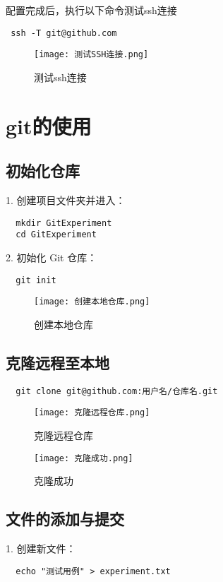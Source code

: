 \documentclass[a4paper, 12pt]{article}
\begin{document}
配置完成后，执行以下命令测试ssh连接
\begin{verbatim}
 ssh -T git@github.com
  \end{verbatim}
  
\begin{figure}[H]
  \centering
 \texttt{[image: 测试SSH连接.png]}
  \caption{测试ssh连接}
   \end{figure}
   
  \newpage
  \section{git的使用}
  \subsection{初始化仓库}
  1. 创建项目文件夹并进入：
  \begin{verbatim}
  mkdir GitExperiment
  cd GitExperiment
  \end{verbatim}
  
  2. 初始化 Git 仓库：
  \begin{verbatim}
  git init
  \end{verbatim}
  
  \begin{figure}[h]
  \centering
 \texttt{[image: 创建本地仓库.png]}
  \caption{创建本地仓库}
   \end{figure}
   
  \subsection{克隆远程至本地}
  \begin{verbatim}
  git clone git@github.com:用户名/仓库名.git
  \end{verbatim}
  
    \begin{figure}[h]
  \centering
 \texttt{[image: 克隆远程仓库.png]}
  \caption{克隆远程仓库}
   \end{figure}
   
     \begin{figure}[H]
  \centering
 \texttt{[image: 克隆成功.png]}
  \caption{克隆成功}
   \end{figure}
  
  \subsection{文件的添加与提交}
  1. 创建新文件：
  \begin{verbatim}
  echo "测试用例" > experiment.txt
  \end{verbatim}
\end{document}
